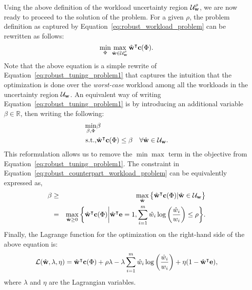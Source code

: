 Using the above definition of the workload uncertainty region 
    $\mathcal{U}_{{\bf{w}}}^\rho$, we are now ready to proceed to the solution of
    the {\robustw} problem. 
For a given $\rho$, the problem definition as captured by
    Equation~\eqref{eq:robust_workload_problem} can be rewritten as follows:
    \begin{equation}\label{eq:robust_tuning_problem1}
        \min_{{{\Phi}}} \max_{{{\hat{\bf{w}}}} \in \mathcal{U}_{{{\bf{w}}}}^\rho}
        {{\hat{\bf{w}}}}^\intercal {{\ensuremath{\bf{c}}}}({{\Phi}}).
    \end{equation}
Note that the above equation is a simple rewrite of
    Equation~\eqref{eq:robust_tuning_problem1} that captures the intuition that
    the optimization is done over the \emph{worst-case} workload among all the
    workloads in the uncertainty region $\mathcal{U}_{{\bf{w}}}$.
An equivalent way of writing Equation~\eqref{eq:robust_tuning_problem1} is by
    introducing an additional variable $\beta\in\mathbb{R}$, then writing the
    following:
\begin{eqnarray}
\label{eq:robust_counterpart_workload_problem}
\min_{\beta, {{\Phi}}}&\beta& \nonumber\\
    \textrm{s.t.,}&{{\hat{\bf{w}}}}^\intercal{{\ensuremath{\bf{c}}}}({{\Phi}}) \leq \beta
                  &\forall  {{\ensuremath{\hat{\bf{w}}}}} \in \mathcal{U}_{{{\bf{w}}}}.
\end{eqnarray}
This reformulation allows us to remove the $\min\max$ term in the objective from 
    Equation~\eqref{eq:robust_tuning_problem1}. 
The constraint in Equation~\eqref{eq:robust_counterpart_workload_problem}
    can be equivalently expressed as,
\begin{eqnarray*}
\label{eq:inner_optimization}
    \beta &\geq&
    \max_{{{\hat{\bf{w}}}}}\big\{{{\hat{\bf{w}}}}^\intercal{{\ensuremath{\bf{c}}}}({{\Phi}}) | {{\hat{\bf{w}}}} \in
    \mathcal{U}_{{{\bf{w}}}}\big\}\nonumber\\
    &=&\max_{{{\hat{\bf{w}}}} \geq
0}\bigg\{{{\hat{\bf{w}}}}^\intercal{{\ensuremath{\bf{c}}}}({{\Phi}})\bigg|{{\hat{\bf{w}}}}^\intercal{{\ensuremath{\bf{e}}}}
= 1, \sum_{i=1}^{m} \hat{w}_i \log\bigg(\frac{\hat{w}_i}{w_i}\bigg) \leq \rho\bigg\}.
\end{eqnarray*}
Finally, the Lagrange function for the optimization on the right-hand side of the above equation is:
\begin{equation*}
    \mathcal{L}({{\hat{\bf{w}}}}, \lambda, \eta) =
    {{\hat{\bf{w}}}}^\intercal{{\ensuremath{\bf{c}}}}({{\Phi}}) + \rho \lambda - \lambda
    \sum_{i=1}^{m}\hat{w}_i \log\bigg(\frac{\hat{w}_i}{w_i}\bigg) + \eta(1 -
    {{\hat{\bf{w}}}}^\intercal {{\ensuremath{\bf{e}}}}),
\end{equation*}
where $\lambda$ and $\eta$ are the Lagrangian variables. 

